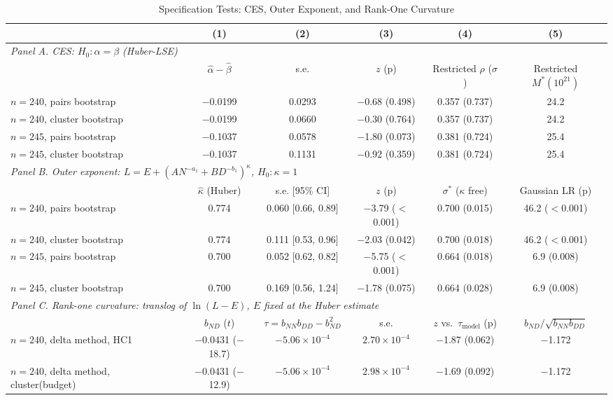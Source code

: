 \begin{table}[!htbp]
\centering
\scriptsize
\caption{Specification Tests: CES, Outer Exponent, and Rank-One Curvature}
\label{tab:m1_spec}
\begin{threeparttable}
\begin{tabular}{lccccc}
\toprule
 & (1) & (2) & (3) & (4) & (5) \\
\midrule
\multicolumn{6}{l}{\textit{Panel A. CES: $H_0:\alpha=\beta$ (Huber-LSE)}} \\
 & $\hat\alpha-\hat\beta$ & s.e. & $z$ (p) & Restricted $\rho$ ($\sigma$) & Restricted $M^*(10^{21})$ \\
$n=240$, pairs bootstrap & $-$0.0199 & 0.0293 & $-$0.68 (0.498) & 0.357 (0.737) & 24.2 \\
$n=240$, cluster bootstrap & $-$0.0199 & 0.0660 & $-$0.30 (0.764) & 0.357 (0.737) & 24.2 \\
$n=245$, pairs bootstrap & $-$0.1037 & 0.0578 & $-$1.80 (0.073) & 0.381 (0.724) & 25.4 \\
$n=245$, cluster bootstrap & $-$0.1037 & 0.1131 & $-$0.92 (0.359) & 0.381 (0.724) & 25.4 \\
\multicolumn{6}{l}{\textit{Panel B. Outer exponent: $L=E+(AN^{-a_1}+BD^{-b_1})^\kappa$, $H_0:\kappa=1$}} \\
 & $\hat\kappa$ (Huber) & s.e. [95\% CI] & $z$ (p) & $\sigma^*$ ($\kappa$ free) & Gaussian LR (p) \\
$n=240$, pairs bootstrap & 0.774 & 0.060 [0.66, 0.89] & $-$3.79 ($<$0.001) & 0.700 (0.015) & 46.2 ($<$0.001) \\
$n=240$, cluster bootstrap & 0.774 & 0.111 [0.53, 0.96] & $-$2.03 (0.042) & 0.700 (0.018) & 46.2 ($<$0.001) \\
$n=245$, pairs bootstrap & 0.700 & 0.052 [0.62, 0.82] & $-$5.75 ($<$0.001) & 0.664 (0.018) & 6.9 (0.008) \\
$n=245$, cluster bootstrap & 0.700 & 0.169 [0.56, 1.24] & $-$1.78 (0.075) & 0.664 (0.028) & 6.9 (0.008) \\
\multicolumn{6}{l}{\textit{Panel C. Rank-one curvature: translog of $\ln(L-E)$, $E$ fixed at the Huber estimate}} \\
 & $b_{ND}$ ($t$) & $\tau=b_{NN}b_{DD}-b_{ND}^2$ & s.e. & $z$ vs.\ $\tau_{\text{model}}$ (p) & $b_{ND}/\sqrt{b_{NN}b_{DD}}$ \\
$n=240$, delta method, HC1 & $-$0.0431 ($-$18.7) & $-5.06\times10^{-4}$ & $2.70\times10^{-4}$ & $-$1.87 (0.062) & $-$1.172 \\
$n=240$, delta method, cluster(budget) & $-$0.0431 ($-$12.9) & $-5.06\times10^{-4}$ & $2.98\times10^{-4}$ & $-$1.69 (0.092) & $-$1.172 \\

\end{tabular}
\end{threeparttable}
\end{table}
